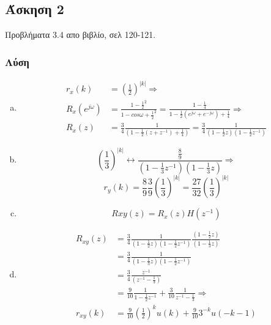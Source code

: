 \newpage\subsection*{Άσκηση 2}

Προβλήματα 3.4 απο βιβλίο, σελ 120-121.

\subsubsection*{Λύση} 
\begin{enumerate}[(a)]
\item \begin{align*}
    r_x(k) &= \left(\frac12\right)^{|k|} \Rightarrow \\
R_x(e^{j\omega})  &=  \frac{1-\frac12^2}{1-cos\omega + \frac12^2} = \frac{1-\frac14}{1-\frac12(e^{j\omega} + e^{-j\omega}) + \frac14} \Rightarrow \\
    R_x(z) &= \frac34 \frac{1}{(1 - \frac12(z+z^{-1}) + \frac14)} = \frac34 \frac{1}{(1-\frac12z)(1-\frac12z^{-1})}
\end{align*}

\item
    \begin{equation*} \left(\frac13\right)^{|k|} \leftrightarrow \frac{\frac89}{(1-\frac13z^{-1})(1-\frac13z)} \Rightarrow \end{equation*}
        \begin{equation*} r_y(k) = \frac89 \frac39 \left(\frac13\right)^{|k|} = \frac{27}{32} \left(\frac13\right)^{|k|} \end{equation*}

\item
\begin{equation*} Rxy(z) = R_x(z) H(z^{-1}) \end{equation*}

\item
    \begin{align*} R_{xy}(z) &=  \frac34 \frac{1}{(1-\frac12z)(1-\frac12z^{-1})} \frac{(1-\frac12z)}{(1-\frac13z)} \\
                       &= \frac34 \frac{1}{(1-\frac13z)(1-\frac12z^{-1})} \\
                       &= \frac34 \frac{z^{-1}}{(z^{-1}-\frac13)} \\
                       &= \frac{9}{10} \frac{1}{1-\frac12z^{-1}} + \frac{3}{10}\frac{1}{z^{-1}-\frac13} \Rightarrow \\
              r_{xy}(k) &= \frac{9}{10}\left(\frac12\right)^{k}u(k) + \frac{9}{10}3^{-k}u(-k-1)
\end{align*}
\end{enumerate}
